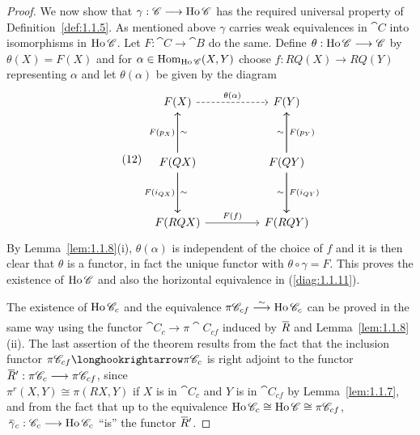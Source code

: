\documentclass[../main]{subfiles}
\begin{document}
\begin{proof}
We now show that $\gamma : \mathscr{C} \longrightarrow \operatorname{Ho} \mathscr{C}$ has the required universal property of Definition~\ref{def:1.1.5}. As mentioned above $\gamma$ carries weak equivalences in $\cat C$ into isomorphisms in $\operatorname{Ho} \mathscr{C}$. Let $F : \cat C \longrightarrow \cat B$ do the same. Define $\theta : \operatorname{Ho} \mathscr{C} \longrightarrow \mathscr{C}$ by $\theta(X) = F(X)$ and for $\alpha \in \operatorname{Hom}_{\operatorname{Ho} \mathscr{C}}(X, Y)$ choose $f : RQ(X) \longrightarrow RQ(Y)$ representing $\alpha$ and let $\theta(\alpha)$ be given by the diagram
\[\tag{12}\label{diag:1.1.12}\begin{tikzcd}
	{F(X)} && {F(Y)} \\
	\\
	{F(QX)} && {F(QY)} \\
	\\
	{F(RQX)} && {F(RQY)}
	\arrow["{\theta(\alpha)}", dashed, from=1-1, to=1-3]
	\arrow["{F(f)}", from=5-1, to=5-3]
	\arrow["{F(p_X)}", from=3-1, to=1-1]
	\arrow["{F(i_{QX})}"', from=3-1, to=5-1]
	\arrow["{F(p_Y)}"', from=3-3, to=1-3]
	\arrow["{F(i_{QY})}", from=3-3, to=5-3]
	\arrow["\sim", from=3-1, to=5-1]
	\arrow["\sim"', from=3-1, to=1-1]
	\arrow["\sim"', from=3-3, to=5-3]
	\arrow["\sim", from=3-3, to=1-3]
\end{tikzcd}\]
By Lemma~\ref{lem:1.1.8}(i), $\theta(\alpha)$ is independent of the choice of $f$ and it is then clear that $\theta$ is a functor, in fact the unique functor with $\theta \circ \gamma = F$. This proves the existence of $\operatorname{Ho} \mathscr{C}$ and also the horizontal equivalence in (\ref{diag:1.1.11}).

The existence of $\operatorname{Ho} \mathscr{C}_c$ and the equivalence $\pi \cat C_{cf} \varrightarrow{\sim} \Ho \cat C_c$ can be proved in the same way using the functor $\cat C_c \longrightarrow \pi \cat C_{cf}$ induced by $\xoverline R$ and Lemma~\ref{lem:1.1.8}(ii). The last assertion of the theorem results from the fact that the inclusion functor $\pi \cat C_{cf} \longhookrightarrow \pi \cat C_c$ is right adjoint to the functor $\xoverline R' : \pi \cat C_c \longrightarrow \pi \cat C_{cf}$, since \\$\pi^r(X, Y) \cong \pi(RX, Y)$ if $X$ is in $\cat C_c$ and $Y$ is in $\cat C_{cf}$ by Lemma~\ref{lem:1.1.7}, and from the fact that up to the equivalence $\operatorname{Ho} \mathscr{C}_c \cong \operatorname{Ho} \mathscr{C} \cong \pi \mathscr{C}_{cf}$, $\,\xoverline \gamma_c : \cat C_c \longrightarrow \Ho \cat C_c$ ``is'' the functor $\xoverline R'$. 
\end{proof} 
\end{document}
